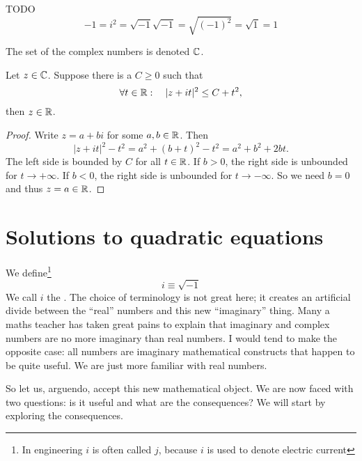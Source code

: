 TODO
\[ -1 = i^2 = \sqrt{-1}\sqrt{-1} = \sqrt{(-1)^2} = \sqrt{1} = 1 \]


The set of the complex numbers is denoted $\mathbb{C}$.

\begin{lemma} \label{lemma:boundedThenReal}
Let $z\in\mathbb{C}$. Suppose there is a $C\geq 0$ such that
\[ \forall t\in\mathbb{R}: \quad |z+it|^2\leq C+t^2, \]
then $z\in \mathbb{R}$.
\end{lemma}
\begin{proof}
Write $z = a+bi$ for some $a,b\in \mathbb{R}$. Then
\[ |z+it|^2-t^2 = a^2 + (b+t)^2 - t^2 = a^2+b^2+2bt. \]
The left side is bounded by $C$ for all $t\in\mathbb{R}$. If $b>0$, the right side is unbounded for $t\to +\infty$. If $b<0$, the right side is unbounded for $t\to -\infty$. So we need $b=0$ and thus $z=a\in\mathbb{R}$.
\end{proof}

\section{Solutions to quadratic equations}
 We define\footnote{In engineering $i$ is often called $j$, because $i$ is used to denote electric current}
\[ i \equiv \sqrt{-1} \]
We call $i$ the . The choice of terminology is not great here; it creates an artificial divide between the ``real'' numbers and this new ``imaginary'' thing. Many a maths teacher has taken great pains to explain that imaginary and complex numbers are no more imaginary than real numbers. I would tend to make the opposite case: all numbers are imaginary mathematical constructs that happen to be quite useful. We are just more familiar with real numbers.

So let us, arguendo, accept this new mathematical object. We are now faced with two questions: is it useful and what are the consequences? We will start by exploring the consequences.

